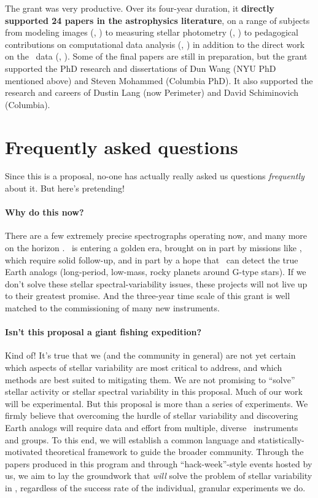 \documentclass[12pt, letterpaper]{article}
\begin{document}
The grant was very productive. Over its four-year duration, it
\textbf{directly supported 24 papers in the astrophysics literature}, on a
range of subjects from modeling images (\eg, \citealt{UNWISE})
to measuring stellar photometry (\eg, \citealt{CPM})
to pedagogical contributions on computational data analysis (\eg, \citealt{MCMC})
in addition to the direct work on the \GALEX\ data (\eg, \citealt{Mohammed}).
Some of the final papers are still in preparation, but the grant
supported the PhD research and dissertations of Dun Wang (NYU PhD
mentioned above) and Steven Mohammed (Columbia PhD).
It also supported the research and careers of Dustin Lang (now
Perimeter) and David Schiminovich (Columbia).

\section{Frequently asked questions}

Since this is a proposal, no-one has actually really asked us
questions \emph{frequently} about it.
But here's pretending!

\paragraph{Why do this now?}
There are a few extremely precise spectrographs operating now, 
and many more on the horizon \citep{Wright2017}.
\EPRV\ is entering a golden era, brought on in part by missions like
\TESS, which require solid follow-up, and in part by a hope that
\EPRV\ can detect the true Earth analogs (long-period, low-mass, rocky
planets around G-type stars).
If we don't solve these stellar spectral-variability issues, these
projects will not live up to their greatest promise.
And the three-year time scale of this grant is well matched to the
commissioning of many new instruments.

\paragraph{Isn't this proposal a giant fishing expedition?}
Kind of! It's true that we (and the community in general) are not yet certain 
which aspects of stellar variability are most critical to address, and which 
methods are best suited to mitigating them. We are not promising to 
``solve'' stellar activity or stellar spectral variability in this proposal.
Much of our work will be 
experimental. But this proposal is more than a series of experiments. 
We firmly believe that overcoming the hurdle of stellar variability and 
discovering Earth analogs will require data and effort from multiple, 
diverse \EPRV\ instruments and groups. To this end, we will establish 
a common language and statistically-motivated theoretical framework 
to guide the broader community. Through the papers produced in this 
program and through ``hack-week''-style events hosted by us, we aim to 
lay the groundwork that \textit{will} solve the problem of stellar variability 
in \EPRV, regardless of the success rate of the individual, granular experiments we do. 
\end{document}
